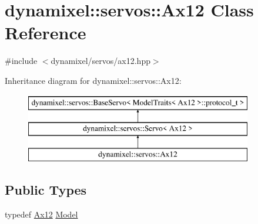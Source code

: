 \hypertarget{classdynamixel_1_1servos_1_1_ax12}{}\section{dynamixel\+:\+:servos\+:\+:Ax12 Class Reference}
\label{classdynamixel_1_1servos_1_1_ax12}


{\ttfamily \#include $<$dynamixel/servos/ax12.\+hpp$>$}

Inheritance diagram for dynamixel\+:\+:servos\+:\+:Ax12\+:\begin{figure}[H]
\begin{center}
\leavevmode
\includegraphics[height=3.000000cm]{classdynamixel_1_1servos_1_1_ax12}
\end{center}
\end{figure}
\subsection*{Public Types}
\begin{DoxyCompactItemize}
\item 
typedef \hyperlink{classdynamixel_1_1servos_1_1_ax12}{Ax12} \hyperlink{classdynamixel_1_1servos_1_1_ax12_acbc408f5319446d13987ee0f45d5f513}{Model}
\end{DoxyCompactItemize}
